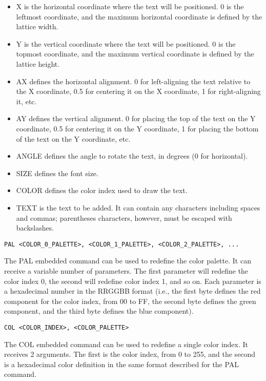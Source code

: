 \documentclass[a4paper]{article}
\begin{document}
\begin{itemize}
  \item X is the horizontal coordinate where the text will be positioned. 0 is the leftmost coordinate, and the maximum horizontal coordinate is defined by the lattice width.
  \item Y is the vertical coordinate where the text will be positioned. 0 is the topmost coordinate, and the maximum vertical coordinate is defined by the lattice height.
  \item AX defines the horizontal alignment. 0 for left-aligning the text relative to the X coordinate, 0.5 for centering it on the X coordinate, 1 for right-aligning it, etc.
  \item AY defines the vertical alignment. 0 for placing the top of the text on the Y coordinate, 0.5 for centering it on the Y coordinate, 1 for placing the bottom of the text on the Y coordinate, etc.
  \item ANGLE defines the angle to rotate the text, in degrees (0 for horizontal).
  \item SIZE defines the font size.
  \item COLOR defines the color index used to draw the text.
  \item TEXT is the text to be added. It can contain any characters including spaces and commas; parentheses characters, however, must be escaped with backslashes.
\end{itemize} 
\bigbreak\bigbreak

\texttt{PAL <COLOR\_0\_PALETTE>, <COLOR\_1\_PALETTE>, <COLOR\_2\_PALETTE>, ...}
\bigbreak

The PAL embedded command can be used to redefine the color palette. It can receive a variable number of parameters. The first parameter will redefine the color index 0, the second will redefine color index 1, and so on. Each parameter is a hexadecimal number in the RRGGBB format (i.e., the first byte defines the red component for the color index, from 00 to FF, the second byte defines the green component, and the third byte defines the blue component).
\bigbreak\bigbreak

\texttt{COL <COLOR\_INDEX>, <COLOR\_PALETTE>}
\bigbreak

The COL embedded command can be used to redefine a single color index. It receives 2 arguments. The first is the color index, from 0 to 255, and the second is a hexadecimal color definition in the same format described for the PAL command.
\bigbreak\bigbreak
\end{document}
